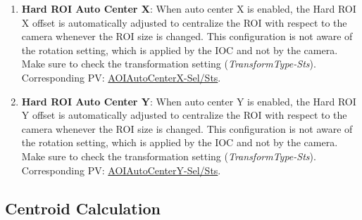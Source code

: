 \documentclass[openany]{article}
\begin{document}
\begin{enumerate}
            \item \textbf{Hard ROI Auto Center X}: When auto center X is enabled, the Hard ROI X offset is automatically adjusted to centralize the ROI with respect to the camera whenever the ROI size is changed. This configuration is not aware of the rotation setting, which is applied by the IOC and not by the camera. Make sure to check the transformation setting (\emph{TransformType-Sts}). Corresponding PV: \hyperlink{pv:hard-roi-auto-center-x}{AOIAutoCenterX-Sel/Sts}.
            \item \textbf{Hard ROI Auto Center Y}: When auto center Y is enabled, the Hard ROI Y offset is automatically adjusted to centralize the ROI with respect to the camera whenever the ROI size is changed. This configuration is not aware of the rotation setting, which is applied by the IOC and not by the camera. Make sure to check the transformation setting (\emph{TransformType-Sts}). Corresponding PV: \hyperlink{pv:hard-roi-auto-center-y}{AOIAutoCenterY-Sel/Sts}.
        \end{enumerate}

    \subsection{Centroid Calculation}\label{sec:centroid-calc}
\end{document}
